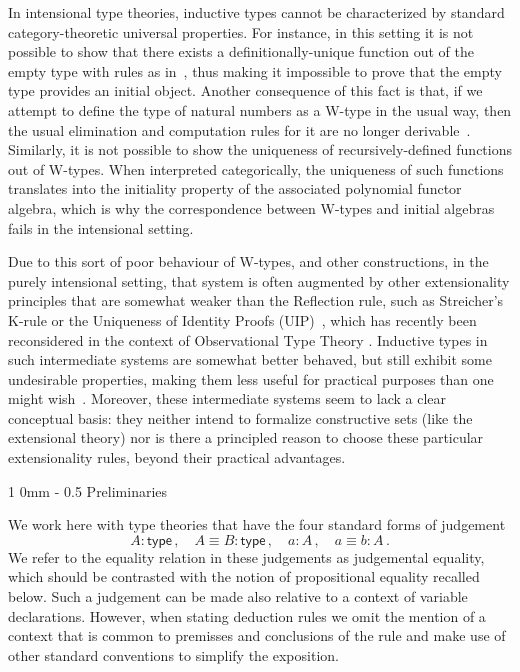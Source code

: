 \documentclass[10pt,a4paper,oneside,reqno]{amsart}
\makeatletter
\numberwithin{equation}{section}
\renewcommand{\section}{\@startsection
  {section}%
   {1}%
  {0mm}%
   {-\baselineskip}%
  {0.5\baselineskip}%
   {\Large\bfseries}}%
\theoremstyle{mythm}
\theoremstyle{mydef}
\theoremstyle{myrmk}
\newcommand{\deq}{\equiv}
\newcommand{\co}{\colon}
\newcommand{\type}{\mathsf{type}}
\makeatother
\begin{document}
\vspace{3cm}

In intensional type theories, inductive types cannot be characterized by standard category-theoretic
universal properties. For instance, in this setting it is not possible to show that there exists a 
definitionally-unique function out of the empty type with rules as in~\cite[Section~5.2]{NordstromB:marltt}, thus making it impossible to prove that the empty type provides an initial object. 
Another consequence of this fact is that, if we attempt to define the type of 
natural numbers as a W-type in the usual way, then 
the usual elimination and computation rules for it are no longer derivable~\cite{DybjerP:repids}. Similarly, it is not possible to show the uniqueness of recursively-defined functions out of W-types. When interpreted categorically, the uniqueness of such functions translates into the initiality property of the associated polynomial functor algebra, which is why the correspondence between W-types and initial algebras fails in the intensional setting.

Due to this sort of poor behaviour of W-types, and other constructions, in the purely intensional setting, that system is often augmented by other extensionality principles that are somewhat weaker than the Reflection rule, such as Streicher's K-rule  or the Uniqueness of Identity Proofs (UIP)~\cite{StreicherT:invitt}, which has recently been reconsidered
in the context of Observational Type Theory \cite{AltenkirchT:obsen}.  Inductive types in such intermediate systems are somewhat better behaved, but still exhibit some undesirable properties, making them less useful for practical purposes than one might wish~\cite{McBrideC:wtygnb}.  Moreover, these intermediate systems seem to lack a clear conceptual basis:  they neither intend to formalize constructive sets (like the extensional theory) nor is there a principled reason to choose these particular extensionality rules, beyond their practical advantages.  

\newpage

\section{Preliminaries}
\label{section:prelim}



We work here with type theories that have the four standard forms of judgement
\[
A \co \type \, , \quad A \deq B \co \type \, , \quad   a \co A \, , \quad a \deq b \co A \, . 
\]
We refer to the equality relation in these judgements as judgemental equality, 
which should be contrasted with the notion of propositional equality
recalled below. 
Such a judgement  can be made also relative to a context of variable declarations.
However, when stating deduction
rules we  omit the mention
of a context that is common to premisses and conclusions of the rule and
make use of other standard conventions to simplify the exposition.
\end{document}

